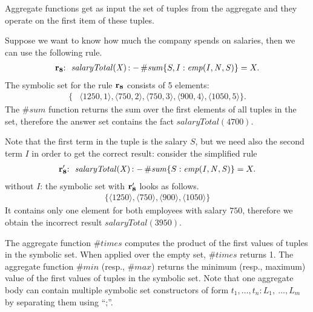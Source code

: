\documentclass[a4paper, titlepage]{article}
\newcommand{\mi}[1]{\mathit{#1}}
\DeclareMathOperator{\leftimpl}{:-}
\newcommand{\row}[1]{%
  \ensuremath{\color{black}\ensuremath{\mathbf{#1}} \color{black}}%
}
\newcommand{\rowprefix}[1]{%
  \ensuremath{\color{black}\mathbf{#1{:}}\ }%
}
\begin{document}
Aggregate functions get as input the set of tuples from the aggregate
and they operate on the first item of these tuples.
\begin{exmp}
Suppose we want to know how much the company spends on salaries,
then we can use the following rule.
\begin{align*}
  \mathit{\rowprefix{r_8} \ salaryTotal(X)} \leftimpl
    \mathit{\#sum}\{S,I : \mathit{emp(I,N,S)}\} = X.
\end{align*}
The symbolic set for the rule $\row{r_8}$ consists of 5 elements: 
\begin{align*}
  \{ & \langle 1250,1 \rangle, \langle 750,2 \rangle,
    \langle 750,3 \rangle, \langle 900,4 \rangle, \langle 1050,5 \rangle\}.
\end{align*}
The $\mi{\#sum}$ function returns
the sum over the first elements of all tuples in the set,
therefore the answer set contains the fact $\mathit{salaryTotal(4700)}$.

Note that the first term in the tuple is the salary $S$,
but we need also the second term $I$ in order to get the correct result:
consider the simplified rule
\begin{align*}
  \mathit{\rowprefix{r_8'} \ salaryTotal(X)} \leftimpl
    \mathit{\#sum}\{S : \mathit{emp(I,N,S)}\} = X.
\end{align*}
without $I$: the symbolic set with \row{r_8'} looks as follows.
\begin{align*}
  \{ \langle 1250 \rangle, \langle 750 \rangle,
  \langle 900 \rangle,  \langle 1050 \rangle\}
\end{align*}
It contains only one element for both employees with salary $750$,
therefore
we obtain the incorrect result $\mathit{salaryTotal(3950)}$.  
\end{exmp}
 
The aggregate function $\mathit{\#times}$ computes the product of 
the first values of tuples in the symbolic set.
When applied over the empty set, 
$\mathit{\#times}$ returns 1.
%
The aggregate function $\mathit{\#min}$ (resp., $\mi{\#max}$) returns 
the minimum (resp., maximum) value
of the first values of tuples in the symbolic set.
%
%
%
%
%
Note that one aggregate body can contain multiple symbolic set constructors 
of form $t_1, \dots, t_n \colon L_1, \ \dots,L_m$
by separating them using \enquote{;}. 
\end{document}
